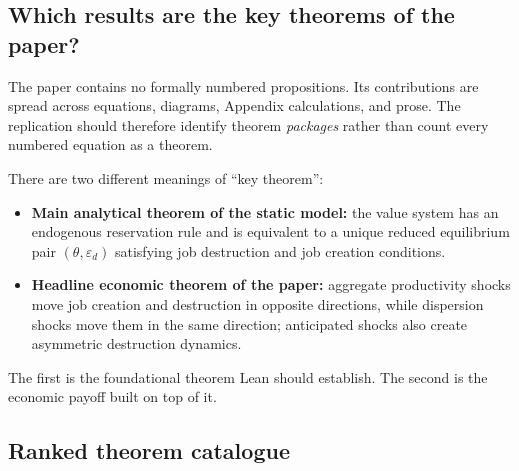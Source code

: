 \documentclass[11pt]{article}
\newcommand{\epsd}{\varepsilon_d}
\begin{document}
\subsection{Which results are the key theorems of the paper?}

The paper contains no formally numbered propositions. Its contributions are spread across equations, diagrams, Appendix calculations, and prose. The replication should therefore identify theorem \emph{packages} rather than count every numbered equation as a theorem.

There are two different meanings of ``key theorem'':

\begin{itemize}
\item \textbf{Main analytical theorem of the static model:} the value system has an endogenous reservation rule and is equivalent to a unique reduced equilibrium pair $(\theta,\epsd)$ satisfying job destruction and job creation conditions.
\item \textbf{Headline economic theorem of the paper:} aggregate productivity shocks move job creation and destruction in opposite directions, while dispersion shocks move them in the same direction; anticipated shocks also create asymmetric destruction dynamics.
\end{itemize}

The first is the foundational theorem Lean should establish. The second is the economic payoff built on top of it.

\subsection{Ranked theorem catalogue}
\end{document}
